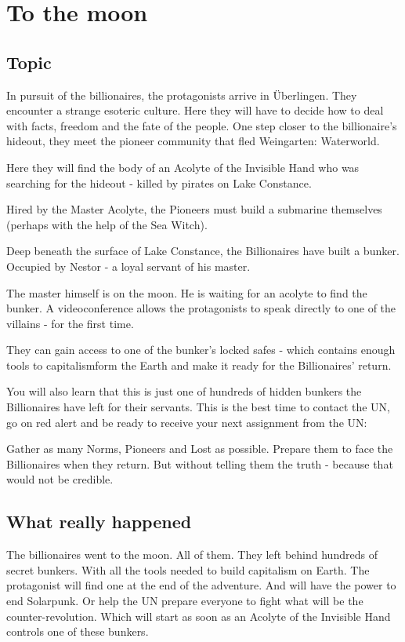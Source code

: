 
\chapter{To the moon}
\label{ch:To the moon}

\section{Topic}

In pursuit of the billionaires, the protagonists arrive in Überlingen. They encounter a strange esoteric culture. Here they will have to decide how to deal with facts, freedom and the fate of the people.
One step closer to the billionaire's hideout, they meet the pioneer community that fled Weingarten: Waterworld.

Here they will find the body of an Acolyte of the Invisible Hand who was searching for the hideout - killed by pirates on Lake Constance.

Hired by the Master Acolyte, the Pioneers must build a submarine themselves (perhaps with the help of the Sea Witch).

Deep beneath the surface of Lake Constance, the Billionaires have built a bunker. Occupied by Nestor - a loyal servant of his master.

The master himself is on the moon. He is waiting for an acolyte to find the bunker. A videoconference allows the protagonists to speak directly to one of the villains - for the first time.

They can gain access to one of the bunker's locked safes - which contains enough tools to capitalismform the Earth and make it ready for the Billionaires' return.

You will also learn that this is just one of hundreds of hidden bunkers the Billionaires have left for their servants. This is the best time to contact the UN, go on red alert and be ready to receive your next assignment from the UN:

Gather as many Norms, Pioneers and Lost as possible. Prepare them to face the Billionaires when they return. But without telling them the truth - because that would not be credible.

\section{What really happened}

The billionaires went to the moon. All of them. They left behind hundreds of secret bunkers. With all the tools needed to build capitalism on Earth. The protagonist will find one at the end of the adventure. And will have the power to end Solarpunk.
Or help the UN prepare everyone to fight what will be the counter-revolution. Which will start as soon as an Acolyte of the Invisible Hand controls one of these bunkers.

